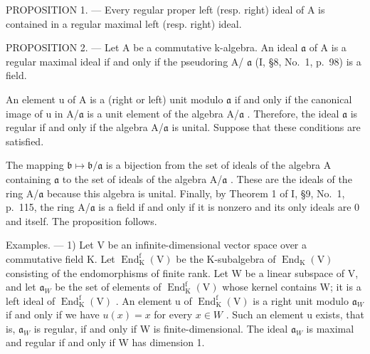 PROPOSITION 1. --- Every regular proper left (resp. right) ideal of A is contained in a regular maximal left (resp. right) ideal.

PROPOSITION 2. --- Let A be a commutative k-algebra. An ideal \(\mathfrak{a}\) of A is a regular maximal ideal if and only if the pseudoring A/ \(\mathfrak{a}\) (I, §8, No.~1, p.~98) is a field.

An element u of A is a (right or left) unit modulo \(\mathfrak{a}\) if and only if the canonical image of u in A/\(\mathfrak{a}\) is a unit element of the algebra A/\(\mathfrak{a}\) . Therefore, the ideal \(\mathfrak{a}\) is regular if and only if the algebra A/\(\mathfrak{a}\) is unital. Suppose that these conditions are satisfied.

The mapping \(\mathfrak{b} \mapsto \mathfrak{b}/\mathfrak{a}\) is a bijection from the set of ideals of the algebra A containing \(\mathfrak{a}\) to the set of ideals of the algebra A/\(\mathfrak{a}\) . These are the ideals of the ring A/\(\mathfrak{a}\) because this algebra is unital. Finally, by Theorem 1 of I, §9, No.~1, p.~115, the ring A/\(\mathfrak{a}\) is a field if and only if it is nonzero and its only ideals are 0 and itself. The proposition follows.

Examples. --- 1) Let V be an infinite-dimensional vector space over a commutative field K. Let \(\operatorname{End}_{\mathrm{K}}^{\mathrm{f}}(\mathrm{V})\) be the K-subalgebra of \(\operatorname{End}_{\mathrm{K}}(\mathrm{V})\) consisting of the endomorphisms of finite rank. Let W be a linear subspace of V, and let \(\mathfrak{a}_{W}\) be the set of elements of \(\operatorname{End}_{\mathrm{K}}^{\mathrm{f}}(\mathrm{V})\) whose kernel contains W; it is a left ideal of \(\operatorname{End}_{\mathrm{K}}^{\mathrm{f}}(\mathrm{V})\) . An element u of \(\operatorname{End}_{\mathrm{K}}^{\mathrm{f}}(\mathrm{V})\) is a right unit modulo \(\mathfrak{a}_{W}\) if and only if we have \(u(x)=x\) for every \(x\in W\) . Such an element u exists, that is, \(\mathfrak{a}_{W}\) is regular, if and only if W is finite-dimensional. The ideal \(\mathfrak{a}_{W}\) is maximal and regular if and only if W has dimension 1.


